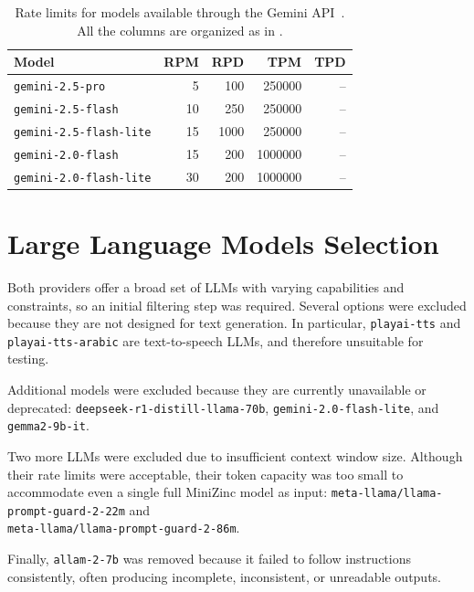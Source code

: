 \documentclass[../../main]{subfiles}
\begin{document}
\begin{table}[ht]
    \centering
    \small
    \begin{tabular}{@{} >{\raggedright\arraybackslash}p{6cm} r r r r @{}}
        \toprule
        Model & RPM & RPD & TPM & TPD \\
        \midrule
        \texttt{gemini-2.5-pro} & 5 & 100 & 250000 & -- \\
        \texttt{gemini-2.5-flash} & 10 & 250 & 250000 & -- \\
        \texttt{gemini-2.5-flash-lite} & 15 & 1000 & 250000 & -- \\
        \texttt{gemini-2.0-flash} & 15 & 200 & 1000000 & -- \\
        \texttt{gemini-2.0-flash-lite} & 30 & 200 & 1000000 & -- \\
        \bottomrule
    \end{tabular}
    \caption{Rate limits for models available through the Gemini API~\cite{GeminiRL}. All the columns are organized as in .}
    \label{tab:rate_limits_gemini}
\end{table}

\section{Large Language Models Selection}

Both providers offer a broad set of LLMs with varying capabilities and constraints, so an initial filtering step was required. Several options were excluded because they are not designed for text generation. In particular, \texttt{playai-tts} and \texttt{playai-tts-arabic} are text-to-speech LLMs, and therefore unsuitable for testing.

Additional models were excluded because they are currently unavailable or deprecated: \texttt{deepseek-r1-distill-llama-70b}, \texttt{gemini-2.0-flash-lite}, and \texttt{gemma2-9b-it}.

Two more LLMs were excluded due to insufficient context window size. Although their rate limits were acceptable, their token capacity was too small to accommodate even a single full MiniZinc model as input: \texttt{meta-llama/llama-prompt-guard-2-22m} and \\\texttt{meta-llama/llama-prompt-guard-2-86m}.

Finally, \texttt{allam-2-7b} was removed because it failed to follow instructions consistently, often producing incomplete, inconsistent, or unreadable outputs.
\end{document}
